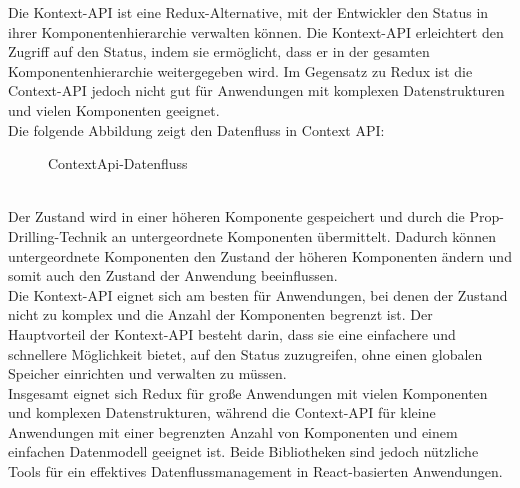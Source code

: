 Die Kontext-API ist eine Redux-Alternative, mit der Entwickler  den Status in ihrer Komponentenhierarchie verwalten können. Die Kontext-API erleichtert den Zugriff auf den Status, indem sie ermöglicht, dass er in der gesamten Komponentenhierarchie weitergegeben wird. Im Gegensatz zu Redux ist die Context-API jedoch nicht gut für Anwendungen mit komplexen Datenstrukturen und  vielen Komponenten geeignet.\\\cite{scalablepath}
Die folgende Abbildung zeigt den Datenfluss in Context API:\\
\begin{figure}[htbp]
	\centering
	\caption{ContextApi-Datenfluss}
\end{figure}\\
Der Zustand wird in einer höheren Komponente gespeichert und durch die Prop-Drilling-Technik an untergeordnete Komponenten übermittelt. Dadurch können untergeordnete Komponenten den Zustand der höheren Komponenten ändern und somit auch den Zustand der Anwendung beeinflussen.\\
Die Kontext-API eignet sich am besten für Anwendungen, bei denen der Zustand nicht zu komplex und die Anzahl der Komponenten begrenzt ist. Der Hauptvorteil der Kontext-API besteht darin, dass sie eine einfachere und schnellere Möglichkeit bietet, auf den Status zuzugreifen, ohne einen globalen Speicher einrichten und verwalten zu müssen.\\\cite{scalablepath}
Insgesamt eignet sich Redux  für große Anwendungen mit vielen Komponenten und  komplexen Datenstrukturen, während die Context-API für kleine Anwendungen mit einer begrenzten Anzahl von Komponenten und einem einfachen Datenmodell geeignet ist. Beide Bibliotheken sind jedoch nützliche Tools für ein effektives Datenflussmanagement in React-basierten Anwendungen.\cite{scalablepath}

